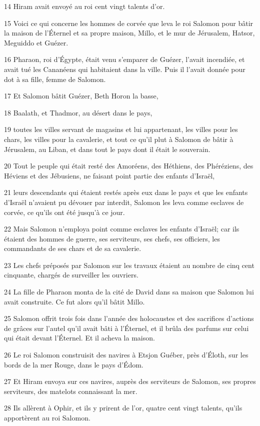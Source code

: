 \par 14 Hiram avait envoyé au roi cent vingt talents d'or.
\par 15 Voici ce qui concerne les hommes de corvée que leva le roi Salomon pour bâtir la maison de l'Éternel et sa propre maison, Millo, et le mur de Jérusalem, Hatsor, Meguiddo et Guézer.
\par 16 Pharaon, roi d'Égypte, était venu s'emparer de Guézer, l'avait incendiée, et avait tué les Cananéens qui habitaient dans la ville. Puis il l'avait donnée pour dot à sa fille, femme de Salomon.
\par 17 Et Salomon bâtit Guézer, Beth Horon la basse,
\par 18 Baalath, et Thadmor, au désert dans le pays,
\par 19 toutes les villes servant de magasins et lui appartenant, les villes pour les chars, les villes pour la cavalerie, et tout ce qu'il plut à Salomon de bâtir à Jérusalem, au Liban, et dans tout le pays dont il était le souverain.
\par 20 Tout le peuple qui était resté des Amoréens, des Héthiens, des Phéréziens, des Héviens et des Jébusiens, ne faisant point partie des enfants d'Israël,
\par 21 leurs descendants qui étaient restés après eux dans le pays et que les enfants d'Israël n'avaient pu dévouer par interdit, Salomon les leva comme esclaves de corvée, ce qu'ils ont été jusqu'à ce jour.
\par 22 Mais Salomon n'employa point comme esclaves les enfants d'Israël; car ils étaient des hommes de guerre, ses serviteurs, ses chefs, ses officiers, les commandants de ses chars et de sa cavalerie.
\par 23 Les chefs préposés par Salomon sur les travaux étaient au nombre de cinq cent cinquante, chargés de surveiller les ouvriers.
\par 24 La fille de Pharaon monta de la cité de David dans sa maison que Salomon lui avait construite. Ce fut alors qu'il bâtit Millo.
\par 25 Salomon offrit trois fois dans l'année des holocaustes et des sacrifices d'actions de grâces sur l'autel qu'il avait bâti à l'Éternel, et il brûla des parfums sur celui qui était devant l'Éternel. Et il acheva la maison.
\par 26 Le roi Salomon construisit des navires à Etsjon Guéber, près d'Éloth, sur les bords de la mer Rouge, dans le pays d'Édom.
\par 27 Et Hiram envoya sur ces navires, auprès des serviteurs de Salomon, ses propres serviteurs, des matelots connaissant la mer.
\par 28 Ils allèrent à Ophir, et ils y prirent de l'or, quatre cent vingt talents, qu'ils apportèrent au roi Salomon.

